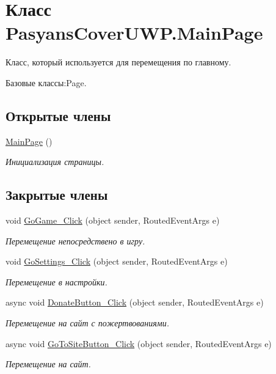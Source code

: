 \hypertarget{class_pasyans_cover_u_w_p_1_1_main_page}{}\section{Класс Pasyans\+Cover\+U\+W\+P.\+Main\+Page}
\label{class_pasyans_cover_u_w_p_1_1_main_page}


Класс, который используется для перемещения по главному.  




Базовые классы\+:Page.

\subsection*{Открытые члены}
\begin{DoxyCompactItemize}
\item 
\hyperlink{class_pasyans_cover_u_w_p_1_1_main_page_ac20d310ee10e37d258daca7671c09aa7}{Main\+Page} ()
\begin{DoxyCompactList}\small\item\em Инициализация страницы. \end{DoxyCompactList}\end{DoxyCompactItemize}
\subsection*{Закрытые члены}
\begin{DoxyCompactItemize}
\item 
void \hyperlink{class_pasyans_cover_u_w_p_1_1_main_page_a241f1356524ae67f597c7f70b9fc7bee}{Go\+Game\+\_\+\+Click} (object sender, Routed\+Event\+Args e)
\begin{DoxyCompactList}\small\item\em Перемещение непосредствено в игру. \end{DoxyCompactList}\item 
void \hyperlink{class_pasyans_cover_u_w_p_1_1_main_page_abe216ee6080b3df3e003061c143e9a39}{Go\+Settings\+\_\+\+Click} (object sender, Routed\+Event\+Args e)
\begin{DoxyCompactList}\small\item\em Перемещение в настройки. \end{DoxyCompactList}\item 
async void \hyperlink{class_pasyans_cover_u_w_p_1_1_main_page_a92a5ab8e2a6a3ca7faa9b2e75de9feb9}{Donate\+Button\+\_\+\+Click} (object sender, Routed\+Event\+Args e)
\begin{DoxyCompactList}\small\item\em Перемещение на сайт с пожертвованиями. \end{DoxyCompactList}\item 
async void \hyperlink{class_pasyans_cover_u_w_p_1_1_main_page_aa6e325227fad15da473a90c6b7137cfe}{Go\+To\+Site\+Button\+\_\+\+Click} (object sender, Routed\+Event\+Args e)
\begin{DoxyCompactList}\small\item\em Перемещение на сайт. \end{DoxyCompactList}\end{DoxyCompactItemize}


